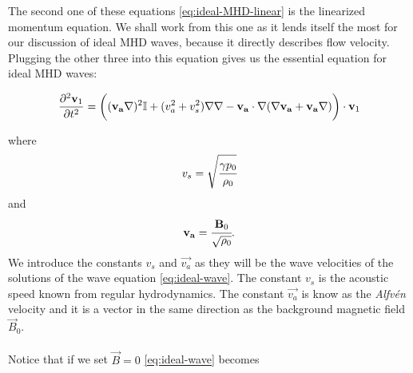 {\centering 
\noindent {}
\par}

The second one of these equations \cref{eq:ideal-MHD-linear} is the linearized momentum equation. 
We shall work from this one as it lends itself the most for our discussion of ideal MHD waves, because it directly describes flow velocity. 
Plugging the other three into this equation gives us the essential equation for ideal MHD waves:

\begin{equation}
	\label{eq:ideal-wave}		
		\frac{\partial^2 \vec{v}_1}{\partial t^2} = \bigg( (\vec{v_a} \nabla)^2 \I + (v_a^2 + v_s^2)\nabla \nabla - \vec{v_a} \cdot \nabla (\nabla \vec{v_a} + \vec{v_a} \nabla) \bigg) \cdot \vec{v}_1
\end{equation}

where
\begin{equation}
v_s = \sqrt{\cfrac{\gamma p_0}{\rho_0}}
\label{eq:acoustic-speed}
\end{equation}
and
\begin{equation}
\vec{v_a} = \cfrac{\vec{B}_0}{\sqrt{\rho_0}}.
\label{eq:Alfven-speed}
\end{equation}
We introduce the constants $v_s$ and $\vec{v_a}$ as they will be the wave velocities of the solutions of the wave equation \cref{eq:ideal-wave}. 
The constant $v_s$ is the acoustic speed known from regular hydrodynamics. 
The constant $\vec{v_a}$ is know as the \emph{Alfvén} velocity and it is a vector in the same direction as the background magnetic field $\vec{B}_0$.\\
\\
Notice that if we set $\vec{B} = 0$ \cref{eq:ideal-wave} becomes

